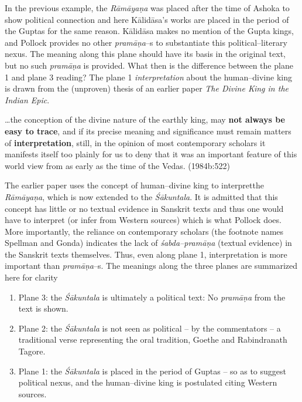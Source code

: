 In the previous example, the \textit{Rāmāyaṇa }was placed after the time of Ashoka to show political connection and here Kālidāsa’s works are placed in the period of the Guptas for the same reason. Kālidāsa makes no mention of the Gupta kings, and Pollock provides no other \textit{pramāṇa}–s to substantiate this political–literary nexus. The meaning along this plane should have its basis in the original text, but no such \textit{pramāṇa} is provided. What then is the difference between the plane 1 and plane 3 reading? The plane 1 \textit{interpretation} about the human–divine king is drawn from the (unproven) thesis of an earlier paper \textit{The Divine King in the Indian Epic}.

\begin{myquote}
…the conception of the divine nature of the earthly king, may \textbf{not always be easy to trace}, and if its precise meaning and significance must remain matters of \textbf{interpretation}, still, in the opinion of most contemporary scholars it manifests itself too plainly for us to deny that it was an important feature of this world view from as early as the time of the Vedas. (1984b:522)
\end{myquote}

The earlier paper uses the concept of human–divine king to interpretthe \textit{Rāmāyaṇa}, which is now extended to the \textit{Śākuntala}. It is admitted that this concept has little or no textual evidence in Sanskrit texts and thus one would have to interpret (or infer from Western sources) which is what Pollock does. More importantly, the reliance on contemporary scholars (the footnote names Spellman and Gonda) indicates the lack of \textit{śabda–pramāṇa }(textual evidence) in the Sanskrit texts themselves. Thus, even along plane 1, interpretation is more important than \textit{pramāṇa}–s. The meanings along the three planes are summarized here for clarity

\begin{enumerate}
\itemsep=0pt
\item Plane 3: the \textit{Śākuntala }is ultimately a political text: No \textit{pramāṇa} from the text is shown.

 \item Plane 2: the \textit{Śākuntala} is not seen as political – by the commentators – a traditional verse representing the oral tradition, Goethe and Rabindranath Tagore.

 \item Plane 1: the \textit{Śākuntala} is placed in the period of Guptas – so as to suggest political nexus, and the human–divine king is postulated citing Western sources.

\end{enumerate}

